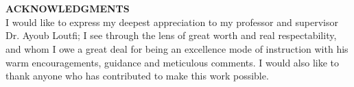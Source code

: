\newenvironment{acknowledgments}
{%
    \thispagestyle{empty}%
    \vspace*{\stretch{2}}%
    \centering
    \justifying      %
}
{\par %
    \vspace{\stretch{3}} %
    \clearpage           %
}

\section*{}
\begin{acknowledgments}{\textbf{ACKNOWLEDGMENTS}}
    \\
    I would like to express my deepest appreciation to my professor and supervisor Dr. Ayoub
    Loutfi; I see through the lens of great worth and real respectability, and whom I
    owe a great deal for being an excellence mode of instruction with his warm encouragements,
    guidance and meticulous comments. I would also like to thank anyone who has contributed to make this work possible.
\end{acknowledgments}

